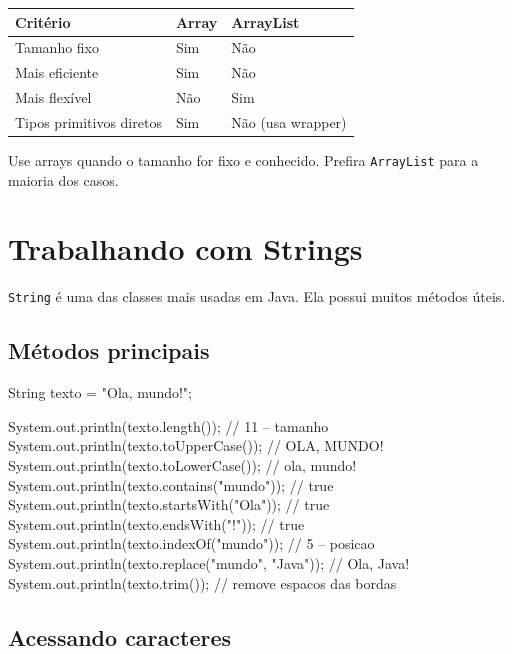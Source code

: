 \documentclass[12pt, a4paper]{article}
\newcommand{\code}[1]{\texttt{\color{javaDeep}#1}}
\begin{document}
\begin{center}
\begin{longtable}{p{5cm} >{\centering\arraybackslash}p{2.5cm} >{\centering\arraybackslash}p{2.5cm}}
\toprule
\rowcolor{javaOrange}
\color{white}\textbf{Critério} &
\color{white}\textbf{Array} &
\color{white}\textbf{ArrayList} \\
\midrule
\endhead
Tamanho fixo & Sim & Não \\
Mais eficiente & Sim & Não \\
Mais flexível & Não & Sim \\
Tipos primitivos diretos & Sim & Não (usa wrapper) \\
\bottomrule
\end{longtable}
\end{center}

Use arrays quando o tamanho for fixo e conhecido. Prefira \code{ArrayList} para a maioria dos casos.

\section{Trabalhando com Strings}

\code{String} é uma das classes mais usadas em Java. Ela possui muitos métodos úteis.

\subsection{Métodos principais}

\begin{javacode}
String texto = "Ola, mundo!";

System.out.println(texto.length());          // 11 -- tamanho
System.out.println(texto.toUpperCase());     // OLA, MUNDO!
System.out.println(texto.toLowerCase());     // ola, mundo!
System.out.println(texto.contains("mundo")); // true
System.out.println(texto.startsWith("Ola")); // true
System.out.println(texto.endsWith("!"));     // true
System.out.println(texto.indexOf("mundo"));  // 5 -- posicao
System.out.println(texto.replace("mundo", "Java")); // Ola, Java!
System.out.println(texto.trim());            // remove espacos das bordas
\end{javacode}

\subsection{Acessando caracteres}
\end{document}
